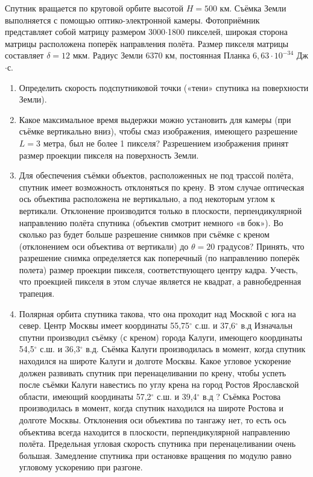 
Спутник вращается по круговой орбите высотой $H=500$ км. Съёмка Земли выполняется с помощью оптико-электронной 
камеры. Фотоприёмник представляет собой матрицу размером 3000$\cdot$1800 пикселей, широкая сторона матрицы 
расположена поперёк направления полёта. Размер пикселя матрицы составляет $\delta=12$ мкм. Радиус Земли 6370 км, 
постоянная Планка $6,63\cdot 10^{-34}$ Дж$\cdot$с.

\begin{enumerate}
    \item Определить скорость подспутниковой точки («тени» спутника на поверхности Земли). 
    \item Какое максимальное время выдержки можно установить для камеры (при съёмке вертикально вниз), чтобы смаз 
    изображения, имеющего разрешение $L=3$ метра, был не более 1 пикселя? Разрешением изображения принят 
    размер проекции пикселя на поверхность Земли.
    \item Для обеспечения съёмки объектов, расположенных не под трассой полёта, спутник имеет 
    возможность отклоняться по крену. В этом случае оптическая ось объектива расположена не вертикально, 
    а под некоторым углом к вертикали. Отклонение производится только в плоскости, перпендикулярной 
    направлению полёта спутника (объектив смотрит немного «в бок»). Во сколько раз будет больше разрешение 
    снимков при съёмке с креном (отклонением оси объектива от вертикали) до $\theta=20$ градусов? Принять, 
    что разрешение снимка определяется как поперечный (по направлению поперёк полета) размер проекции пикселя, 
    соответствующего центру кадра. Учесть, что проекцией пикселя в этом случае является не квадрат, а 
    равнобедренная трапеция.
    \item Полярная орбита спутника такова, что она проходит над Москвой с юга на север. Центр Москвы имеет 
    координаты 55,75$^{\circ}$  с.ш. и 37,6$^{\circ}$  в.д Изначальн спутни производил съёмку (с креном) города 
    Калуги, имеющего координаты 54,5$^{\circ}$  с.ш. и 36,3$^{\circ}$ в.д. Съёмка Калуги производилась в момент, 
    когда спутник находился на широте Калуги и долготе Москвы. Какое угловое ускорение должен развивать 
    спутник при перенацеливании по крену, чтобы успеть после съёмки Калуги навестись по углу крена на город 
    Ростов Ярославской области, имеющий координаты 57,2$^{\circ}$ с.ш. и 39,4$^{\circ}$  в.д ? Съёмка Ростова 
    производилась в момент, когда спутник находился на широте Ростова и долготе Москвы. Отклонения оси 
    объектива по тангажу нет, то есть ось объектива всегда находится в плоскости, перпендикулярной направлению 
    полёта. Предельная угловая скорость спутника при перенацеливании очень большая. Замедление спутника при 
    остановке вращения по модулю равно угловому ускорению при разгоне. 
\end{enumerate}

